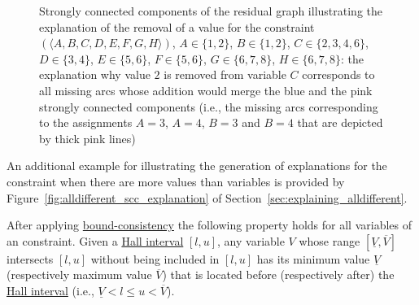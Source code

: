 \begin{ctrdesc}
\begin{figure}[!h]
{
\caption{\label{fig:alldifferent3}
Strongly connected components of the residual graph illustrating the explanation of the removal of a value for the constraint $(\langle A,B,C,D,E,F,G,H\rangle)$, $A\in\{1,2\}$, $B\in\{1,2\}$, $C\in\{2,3,4,6\}$, $D\in\{3,4\}$, $E\in\{5,6\}$, $F\in\{5,6\}$, $G\in\{6,7,8\}$, $H\in\{6,7,8\}$: the explanation why value $2$ is removed from variable $C$ corresponds to all missing arcs whose addition would merge the blue and the pink strongly connected components (i.e., the missing arcs corresponding to the assignments $A=3$, $A=4$, $B=3$ and $B=4$ that are depicted by thick pink lines)}
}
\end{figure}

An additional example for illustrating the generation of explanations for the  constraint
when there are more values than variables
is provided by Figure~\ref{fig:alldifferent_scc_explanation} of Section~\ref{sec:explaining_alldifferent}.

After applying \hyperlink{bound-consistency}{bound-consistency} the following property holds for all variables
of an  constraint.\marginpar{\bclampe}
Given a \hyperlink{Hall_interval}{Hall interval} $[l,u]$,
any variable $V$ whose range $[\underline{V},\overline{V}]$ intersects $[l,u]$ without being included in $[l,u]$
has its minimum value $\underline{V}$ (respectively maximum value $\overline{V}$)
that is located before (respectively after) the \hyperlink{Hall_interval}{Hall interval}
(i.e., $\underline{V}<l\leq u<\overline{V}$).


\end{ctrdesc}
